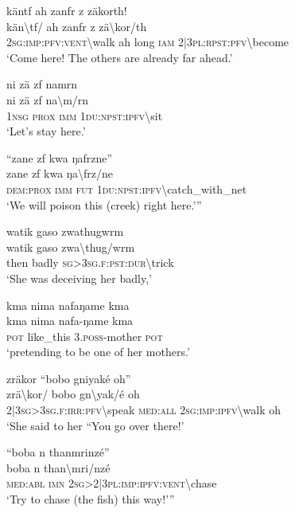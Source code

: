 \ea\label{ex:6:a1215}
käntf ah zanfr z zäkorth!\\
\gll kän{\textbackslash}tf/	ah	zanfr	z	zä{\textbackslash}kor/th\\
     2\textsc{sg}:\textsc{imp}:\textsc{pfv}:\textsc{vent}{\textbackslash}walk	ah	long	\textsc{iam}	2|3\textsc{pl}:\textsc{rpst}:\textsc{pfv}{\textbackslash}become\\
\glt `Come here! The others are already far ahead.'
\z

\ea\label{ex:6:a1216}
ni zä zf namrn\\
\gll ni	zä	zf	na{\textbackslash}m/rn\\
     1\textsc{nsg}	\textsc{prox}	\textsc{imm}	1\textsc{du}:\textsc{npst}:\textsc{ipfv}{\textbackslash}sit\\
\glt `Let's stay here.'
\z

\ea\label{ex:6:a1217}
``zane zf kwa ŋafrzne''\\
\gll zane	zf	kwa	ŋa{\textbackslash}frz/ne\\
     \textsc{dem}:\textsc{prox}	\textsc{imm}	\textsc{fut}	1\textsc{du}:\textsc{npst}:\textsc{ipfv}{\textbackslash}catch\_with\_net\\
\glt `We will poison this (creek) right here.'''
\z

\ea\label{ex:6:a1219}
watik gaso zwathugwrm\\
\gll watik	gaso	zwa{\textbackslash}thug/wrm\\
     then	badly	\textsc{sg}>3\textsc{sg}.\textsc{f}:\textsc{pst}:\textsc{dur}{\textbackslash}trick\\
\glt `She was deceiving her badly,'
\z

\ea\label{ex:6:a1220}
kma nima nafaŋame kma\\
\gll kma	nima	nafa-ŋame	kma\\
     \textsc{pot}	like\_this	3.\textsc{poss}-mother	\textsc{pot}\\
\glt `pretending to be one of her mothers.'
\z

\ea\label{ex:6:a1221}
zräkor ``bobo gniyaké oh''\\
\gll zrä{\textbackslash}kor/	bobo	gn{\textbackslash}yak/é	oh\\
     2|3\textsc{sg}>3\textsc{sg}.\textsc{f}:\textsc{irr}:\textsc{pfv}{\textbackslash}speak	\textsc{med}:\textsc{all}	2\textsc{sg}:\textsc{imp}:\textsc{ipfv}{\textbackslash}walk	oh\\
\glt `She said to her ``You go over there!'
\z

\ea\label{ex:6:a1222}
``boba n thanmrinzé''\\
\gll boba	n	than{\textbackslash}mri/nzé\\
     \textsc{med}:\textsc{abl}	\textsc{imn}	2\textsc{sg}>2|3\textsc{pl}:\textsc{imp}:\textsc{ipfv}:\textsc{vent}{\textbackslash}chase\\
\glt `Try to chase (the fish) this way!'''
\z


